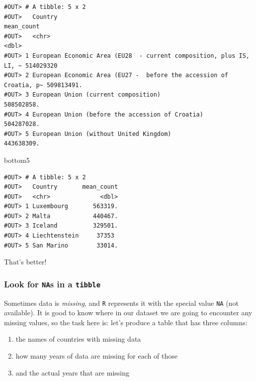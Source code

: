 \documentclass[]{book}
\newenvironment{Shaded}{\begin{snugshade}}{\end{snugshade}}
\newcommand{\NormalTok}[1]{#1}
\providecommand{\tightlist}{%
  \setlength{\itemsep}{0pt}\setlength{\parskip}{0pt}}
\begin{document}
\begin{verbatim}
#OUT> # A tibble: 5 x 2
#OUT>   Country                                                             mean_count
#OUT>   <chr>                                                                    <dbl>
#OUT> 1 European Economic Area (EU28  - current composition, plus IS, LI, ~ 514029320 
#OUT> 2 European Economic Area (EU27 -  before the accession of Croatia, p~ 509813491.
#OUT> 3 European Union (current composition)                                508502858.
#OUT> 4 European Union (before the accession of Croatia)                    504287028.
#OUT> 5 European Union (without United Kingdom)                             443638309.
\end{verbatim}

\begin{Shaded}
\begin{Highlighting}[]
\NormalTok{bottom5}
\end{Highlighting}
\end{Shaded}

\begin{verbatim}
#OUT> # A tibble: 5 x 2
#OUT>   Country       mean_count
#OUT>   <chr>              <dbl>
#OUT> 1 Luxembourg       563319.
#OUT> 2 Malta            440467.
#OUT> 3 Iceland          329501.
#OUT> 4 Liechtenstein     37353 
#OUT> 5 San Marino        33014.
\end{verbatim}

That's better!

\subsubsection*{\texorpdfstring{Look for \texttt{NA}s in a
\texttt{tibble}}{Look for NAs in a tibble}}\label{look-for-nas-in-a-tibble}

Sometimes data is \emph{missing}, and \texttt{R} represents it with the
special value \texttt{NA} (not available). It is good to know where in
our dataset we are going to encounter any missing values, so the task
here is: let's produce a table that has three columns:

\begin{enumerate}
\def\labelenumi{\arabic{enumi}.}
\tightlist
\item
  the names of countries with missing data
\item
  how many years of data are missing for each of those
\item
  and the actual years that are missing
\end{enumerate}
\end{document}
